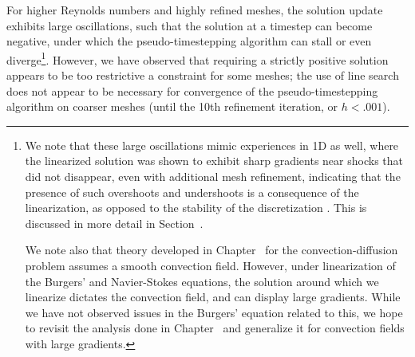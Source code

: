 For higher Reynolds numbers and highly refined meshes, the solution update exhibits large oscillations, such that the solution at a timestep can become negative, under which the pseudo-timestepping algorithm can stall or even diverge\footnote{We note that these large oscillations mimic experiences in 1D as well, where the linearized solution was shown to exhibit sharp gradients near shocks that did not disappear, even with additional mesh refinement, indicating that the presence of such overshoots and undershoots is a consequence of the linearization, as opposed to the stability of the discretization \cite{NS_DPG1D}.  This is discussed in more detail in Section~.  

We note also that theory developed in Chapter~ for the convection-diffusion problem assumes a smooth convection field.  However, under linearization of the Burgers' and Navier-Stokes equations, the solution around which we linearize dictates the convection field, and can display large gradients.  While we have not observed issues in the Burgers' equation related to this, we hope to revisit the analysis done in Chapter~ and generalize it for convection fields with large gradients.}.  However, we have observed that requiring a strictly positive solution appears to be too restrictive a constraint for some meshes; the use of line search does not appear to be necessary for convergence of the pseudo-timestepping algorithm on coarser meshes (until the 10th refinement iteration, or $h< .001$).  

